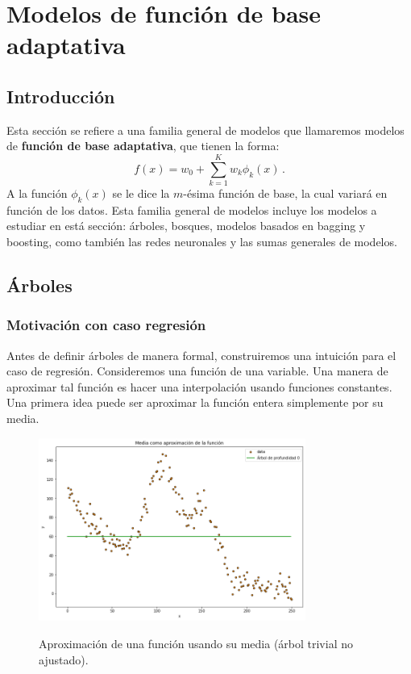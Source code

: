\section{Modelos de función de base adaptativa}
\label{cap:adaptativa}

\subsection{Introducción}
\label{sec:intro_adap}

Esta sección se refiere a una familia general de modelos que llamaremos modelos de \textbf{función de base adaptativa}, que tienen la forma:
\begin{equation}
    f(x) = w_0 + \sum^K_{k=1} w_k \phi_k(x) \,. 
\end{equation}
A la función $\phi_k(x)$ se le dice la $m$-ésima función de base, la cual variará en función de los datos. Esta familia general de modelos incluye los modelos a estudiar en está sección: árboles, bosques, modelos basados en bagging y boosting, como también las redes neuronales y las sumas generales de modelos.


\subsection{Árboles}
\label{sec:arbol}

\subsubsection{Motivación con caso regresión}

Antes de definir árboles de manera formal, construiremos una intuición para el caso de regresión. Consideremos una función de una variable. Una manera de aproximar tal función es hacer una interpolación usando funciones constantes. Una primera idea puede ser aproximar la función entera simplemente por su media.

\begin{figure}[h]
	\centering
	\includegraphics[height=6cm]{img/capN_arbol_trivial.png}\\
	\caption{Aproximación de una función usando su media (árbol trivial no ajustado).}
\end{figure}

